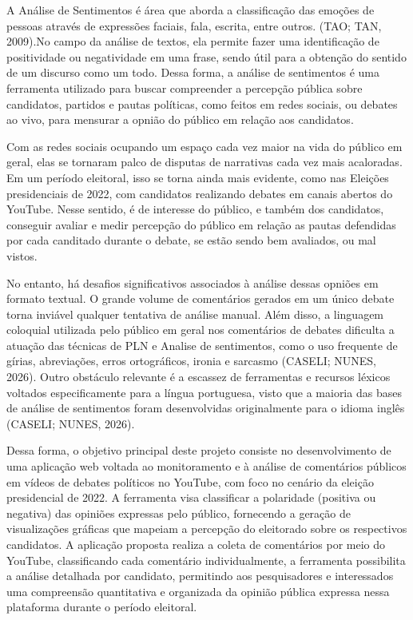 \documentclass[
	12pt,				%
	openright,			%
	oneside,			%
	a4paper,			%
	english,			%
	brazil				%
	]{abntex2}
\begin{document}
A Análise de Sentimentos é área que aborda a classificação das emoções de pessoas através de expressões faciais, fala, escrita, entre outros.
(TAO; TAN, 2009).No campo da análise de textos, ela permite fazer uma identificação de positividade ou negatividade em uma frase, sendo útil para a obtenção do sentido de um discurso como um todo. Dessa forma, a análise de sentimentos é uma ferramenta utilizado para buscar compreender a percepção pública sobre candidatos, partidos e pautas políticas, como feitos em redes sociais, ou debates ao vivo, para mensurar a opnião do público em relação aos candidatos.

Com as redes sociais ocupando um espaço cada vez maior na vida do público em geral, elas se tornaram palco de disputas de narrativas cada vez mais acaloradas. Em um período eleitoral, isso se torna ainda mais evidente, como nas Eleições presidenciais de 2022, com candidatos realizando debates em canais abertos do YouTube. Nesse sentido, é de interesse do público, e também dos candidatos, conseguir avaliar e medir percepção do público em relação as pautas defendidas por cada canditado durante o debate, se estão sendo bem avaliados, ou mal vistos.

No entanto, há desafios significativos associados à análise dessas opniões em formato textual. O grande volume de comentários gerados em um único debate torna inviável qualquer tentativa de análise manual. Além disso, a linguagem coloquial utilizada pelo público em geral nos comentários de debates dificulta a atuação das técnicas de PLN e Analise de sentimentos, como o uso frequente de gírias, abreviações, erros ortográficos, ironia e sarcasmo (CASELI; NUNES, 2026). 
Outro obstáculo relevante é a escassez de ferramentas e recursos léxicos voltados especificamente para a língua portuguesa, visto que a maioria das bases de análise de sentimentos foram desenvolvidas originalmente para o idioma inglês (CASELI; NUNES, 2026).

Dessa forma, o objetivo principal deste projeto consiste no desenvolvimento de uma aplicação web voltada ao monitoramento e à análise de comentários públicos em vídeos de debates políticos no YouTube, com foco no cenário da eleição presidencial de 2022. A ferramenta visa classificar a polaridade (positiva ou negativa) das opiniões expressas pelo público, fornecendo a geração de visualizações gráficas que mapeiam a percepção do eleitorado sobre os respectivos candidatos. A aplicação proposta realiza a coleta de comentários por meio do YouTube, classificando cada comentário individualmente, a ferramenta possibilita a análise detalhada por candidato, permitindo aos pesquisadores e interessados uma compreensão quantitativa e organizada da opinião pública expressa nessa plataforma durante o período eleitoral.
\end{document}
